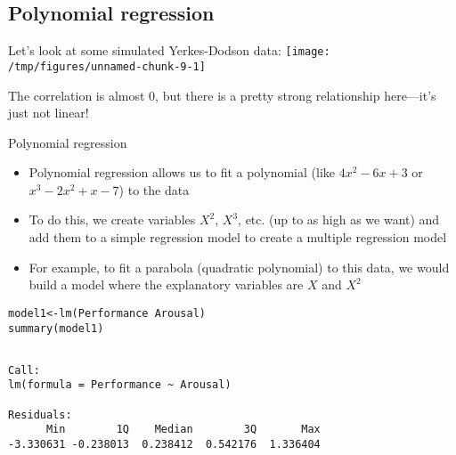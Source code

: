 \documentclass{beamer}\usepackage[]{graphicx}\usepackage[]{color}
\makeatletter
\def\maxwidth{ %
  \ifdim\Gin@nat@width>\linewidth
    \linewidth
  \else
    \Gin@nat@width
  \fi
}
\newcommand{\hlopt}[1]{\textcolor[rgb]{1,0.894,0.769}{#1}}%
\newcommand{\hlstd}[1]{\textcolor[rgb]{1,0.894,0.769}{#1}}%
\newcommand{\hlkwb}[1]{\textcolor[rgb]{0.804,0.776,0.451}{#1}}%
\newcommand{\hlkwd}[1]{\textcolor[rgb]{1,0.78,0.769}{#1}}%
\newenvironment{kframe}{%
 \def\at@end@of@kframe{}%
 \ifinner\ifhmode%
  \def\at@end@of@kframe{\end{minipage}}%
  \begin{minipage}{\columnwidth}%
 \fi\fi%
 \def\FrameCommand##1{\hskip\@totalleftmargin \hskip-\fboxsep
 \colorbox{shadecolor}{##1}\hskip-\fboxsep
     \hskip-\linewidth \hskip-\@totalleftmargin \hskip\columnwidth}%
 \MakeFramed {\advance\hsize-\width
   \@totalleftmargin\z@ \linewidth\hsize
   \@setminipage}}%
 {\par\unskip\endMakeFramed%
 \at@end@of@kframe}
\newenvironment{knitrout}{}{} %
\makeatother
\begin{document}
\begin{darkframes}
    \section{Polynomial regression}

    \begin{frame}
    \end{frame}

    \begin{frame}
      Let's look at some simulated Yerkes-Dodson data:
\begin{knitrout}
\color{fgcolor}
\texttt{[image: /tmp/figures/unnamed-chunk-9-1]} 

\end{knitrout}
      The correlation is almost 0, but there is a pretty strong relationship here---it's just not linear!
    \end{frame}

    \begin{frame}{Polynomial regression}
      \begin{itemize}[<+->]
        \item Polynomial regression allows us to fit a polynomial (like $4x^2-6x+3$ or $x^3-2x^2+x-7$) to the data
        \item To do this, we create variables $X^2$, $X^3$, etc. (up to as high as we want) and add them to a simple regression model to create a multiple regression model
        \item For example, to fit a parabola (quadratic polynomial) to this data, we would build a model where the explanatory variables are $X$ and $X^2$
      \end{itemize}
    \end{frame}

    \begin{frame}[fragile]
      \fontvsm
\begin{knitrout}
\color{fgcolor}\begin{kframe}
\begin{alltt}
\hlstd{model1} \hlkwb{<-} \hlkwd{lm}\hlstd{(Performance} \hlopt{~} \hlstd{Arousal)}
\hlkwd{summary}\hlstd{(model1)}
\end{alltt}
\begin{verbatim}

Call:
lm(formula = Performance ~ Arousal)

Residuals:
      Min        1Q    Median        3Q       Max 
-3.330631 -0.238013  0.238412  0.542176  1.336404 


\end{verbatim}
\end{kframe}
\end{knitrout}
\end{frame}
\end{darkframes}
\end{document}
